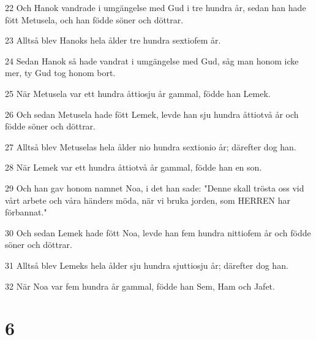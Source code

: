 \par 22 Och Hanok vandrade i umgängelse med Gud i tre hundra år, sedan han hade fött Metusela, och han födde söner och döttrar.
\par 23 Alltså blev Hanoks hela ålder tre hundra sextiofem år.
\par 24 Sedan Hanok så hade vandrat i umgängelse med Gud, såg man honom icke mer, ty Gud tog honom bort.
\par 25 När Metusela var ett hundra åttiosju år gammal, födde han Lemek.
\par 26 Och sedan Metusela hade fött Lemek, levde han sju hundra åttiotvå år och födde söner och döttrar.
\par 27 Alltså blev Metuselas hela ålder nio hundra sextionio år; därefter dog han.
\par 28 När Lemek var ett hundra åttiotvå år gammal, födde han en son.
\par 29 Och han gav honom namnet Noa, i det han sade: "Denne skall trösta oss vid vårt arbete och våra händers möda, när vi bruka jorden, som HERREN har förbannat."
\par 30 Och sedan Lemek hade fött Noa, levde han fem hundra nittiofem år och födde söner och döttrar.
\par 31 Alltså blev Lemeks hela ålder sju hundra sjuttiosju år; därefter dog han.
\par 32 När Noa var fem hundra år gammal, födde han Sem, Ham och Jafet.

\chapter{6}


